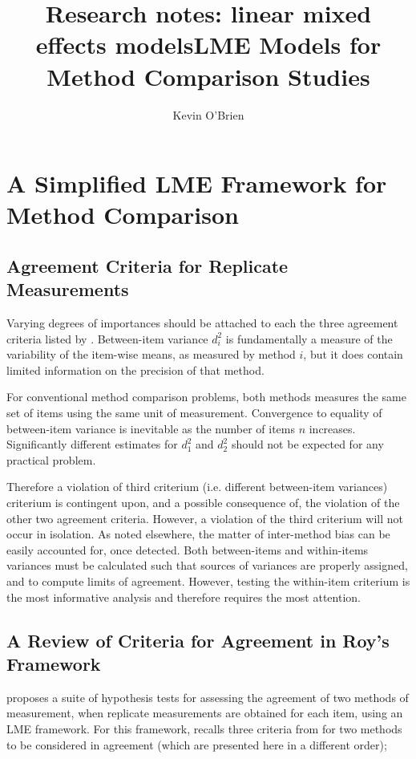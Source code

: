 \documentclass[12pt, a4paper]{report}
\title{Research notes: linear mixed effects models}
\author{ } \date{ }
\theoremstyle{plain}
\theoremstyle{definition}
\theoremstyle{remark}
\begin{document}
\author{Kevin O'Brien}
\title{LME Models for Method Comparison Studies}

\chapter{A Simplified LME Framework for Method Comparison}
\section{Agreement Criteria for Replicate Measurements}


Varying degrees of importances should be attached to each the three agreement criteria listed by \citet{Barnhart}. Between-item variance $d^2_i$ is fundamentally a measure of the variability of the item-wise means, as measured by method $i$, but it does contain limited information on the precision of that method. 

For conventional method comparison problems, both methods measures the same set of items using the same unit of measurement. Convergence to equality of between-item variance is inevitable as the number of items $n$ increases. Significantly different estimates for $d^2_1$ and $d^2_2$ should not be expected for any practical problem. 

Therefore a violation of third criterium (i.e. different between-item variances) criterium is contingent upon, and a  
possible consequence of, the violation of the other two agreement criteria. However, a violation of the third criterium will not occur in isolation. As noted elsewhere, the matter of inter-method bias can be easily accounted for, once detected. Both between-items and within-items variances must be calculated such that sources of variances are properly assigned, and to compute limits of agreement. However, testing the within-item criterium is the most informative analysis and therefore requires the most attention. 

\section{A Review of Criteria for Agreement in Roy's Framework}

\citet{ARoy2009} proposes a suite of hypothesis tests for assessing the agreement of two methods of measurement, when replicate measurements are obtained for each item, using an LME framework. For this framework, \citet{ARoy2009} recalls three criteria from \citet{Barnhart} for two methods to be considered in agreement (which are presented here in a different order);
\end{document}

